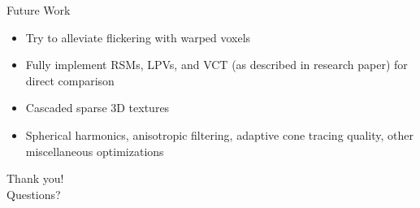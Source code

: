 \documentclass[10pt]{beamer}
\begin{document}
\begin{frame}{Future Work}


  \begin{itemize}
    \item Try to alleviate flickering with warped voxels %
    \item Fully implement RSMs, LPVs, and VCT (as described in research paper) for direct comparison %
    \item Cascaded sparse 3D textures %
    \item Spherical harmonics, anisotropic filtering, adaptive cone tracing quality, other miscellaneous optimizations %
  \end{itemize}
\end{frame}

\begin{frame}[standout]
  \LARGE Thank you!\\
  \vspace{1cm}
  \LARGE Questions?
\end{frame}

\end{document}
